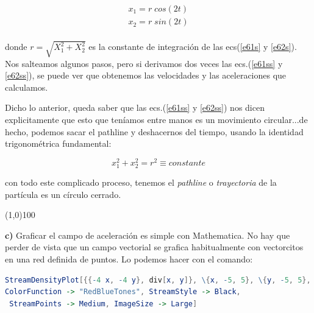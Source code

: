 \documentclass[10pt,a4paper]{article}
\begin{document}
\begin{eqnarray}
\label{e61ss}x_1 = r\; cos(2t) \\
\label{e62ss}x_2 = r\; sin(2t) \\
\end{eqnarray}

\noindent donde $r = \sqrt{X_1^2 + X_2^2}$ es la constante de integración de las ecs(\ref{e61s} y \ref{e62s}). Nos salteamos algunos pasos, pero si derivamos dos veces las ecs.(\ref{e61ss} y \ref{e62ss}), se puede ver que obtenemos las velocidades y las aceleraciones que calculamos. 

Dicho lo anterior, queda saber que las ecs.(\ref{e61ss} y \ref{e62ss}) nos dicen explicitamente que esto que teníamos entre manos es un movimiento circular...de hecho, podemos sacar el pathline y deshacernos del tiempo, usando la identidad trigonométrica fundamental:

\begin{equation}
x_1^2 + x_2^2 = r^2 \equiv constante \label{e63sol}
\end{equation}

\noindent con todo este complicado proceso, tenemos el \textit{pathline} o \textit{trayectoria} de la partícula es un círculo cerrado.

\line(1,0){100}

\textbf{c)} Graficar el campo de aceleración es simple con Mathematica. No hay que perder de vista que un campo vectorial se grafica habitualmente con vectorcitos en una red definida de puntos. Lo podemos hacer con el comando:

\begin{lstlisting}[language = Mathematica]
StreamDensityPlot[{{-4 x, -4 y}, div[x, y]}, \{x, -5, 5}, \{y, -5, 5},
ColorFunction -> "RedBlueTones", StreamStyle -> Black,  
 StreamPoints -> Medium, ImageSize -> Large]
\end{lstlisting}
\end{document}
